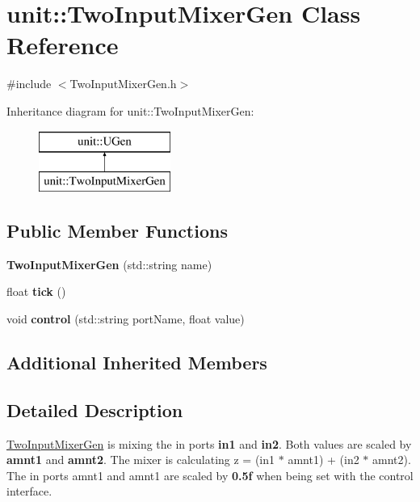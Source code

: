 \hypertarget{classunit_1_1TwoInputMixerGen}{\section{unit\-:\-:Two\-Input\-Mixer\-Gen Class Reference}
\label{classunit_1_1TwoInputMixerGen}
}


{\ttfamily \#include $<$Two\-Input\-Mixer\-Gen.\-h$>$}

Inheritance diagram for unit\-:\-:Two\-Input\-Mixer\-Gen\-:\begin{figure}[H]
\begin{center}
\leavevmode
\includegraphics[height=2.000000cm]{classunit_1_1TwoInputMixerGen}
\end{center}
\end{figure}
\subsection*{Public Member Functions}
\begin{DoxyCompactItemize}
\item 
\hypertarget{classunit_1_1TwoInputMixerGen_ae150f51a934ffb7330f8a2852b094539}{{\bfseries Two\-Input\-Mixer\-Gen} (std\-::string name)}\label{classunit_1_1TwoInputMixerGen_ae150f51a934ffb7330f8a2852b094539}

\item 
\hypertarget{classunit_1_1TwoInputMixerGen_aef96ef6828e767384a8881d108c0d52b}{float {\bfseries tick} ()}\label{classunit_1_1TwoInputMixerGen_aef96ef6828e767384a8881d108c0d52b}

\item 
\hypertarget{classunit_1_1TwoInputMixerGen_ab8d7d00eb0c692a8c2de706f58673d3d}{void {\bfseries control} (std\-::string port\-Name, float value)}\label{classunit_1_1TwoInputMixerGen_ab8d7d00eb0c692a8c2de706f58673d3d}

\end{DoxyCompactItemize}
\subsection*{Additional Inherited Members}


\subsection{Detailed Description}
\hyperlink{classunit_1_1TwoInputMixerGen}{Two\-Input\-Mixer\-Gen} is mixing the in ports {\bfseries in1} and {\bfseries in2}. Both values are scaled by {\bfseries amnt1} and {\bfseries amnt2}. The mixer is calculating z = (in1 $\ast$ amnt1) + (in2 $\ast$ amnt2). The in ports amnt1 and amnt1 are scaled by {\bfseries 0.\-5f} when being set with the control interface.


